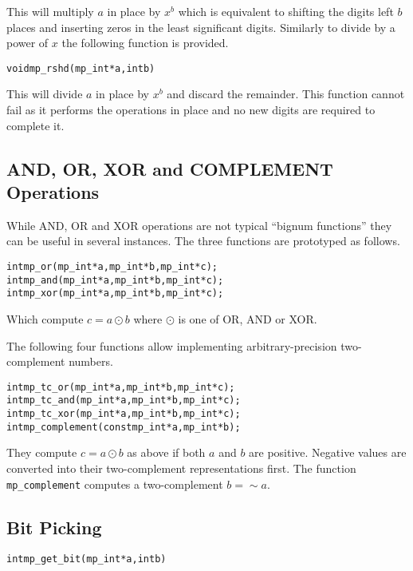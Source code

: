 \documentclass[synpaper]{book}
\begin{document}
This will multiply $a$ in place by $x^b$ which is equivalent to shifting the digits left $b$ places and inserting zeros
in the least significant digits.  Similarly to divide by a power of $x$ the following function is provided.

\begin{alltt}
void mp_rshd (mp_int * a, int b)
\end{alltt}
This will divide $a$ in place by $x^b$ and discard the remainder.  This function cannot fail as it performs the operations
in place and no new digits are required to complete it.

\subsection{AND, OR, XOR and COMPLEMENT Operations}

While AND, OR and XOR operations are not typical ``bignum functions'' they can be useful in several instances.  The
three functions are prototyped as follows.

  
\begin{alltt}
int mp_or  (mp_int * a, mp_int * b, mp_int * c);
int mp_and (mp_int * a, mp_int * b, mp_int * c);
int mp_xor (mp_int * a, mp_int * b, mp_int * c);
\end{alltt}

Which compute $c = a \odot b$ where $\odot$ is one of OR, AND or XOR.

The following four functions allow implementing arbitrary-precision two-complement numbers.

    \label{tcbitwiseops}
\begin{alltt}
int mp_tc_or  (mp_int * a, mp_int * b, mp_int * c);
int mp_tc_and (mp_int * a, mp_int * b, mp_int * c);
int mp_tc_xor (mp_int * a, mp_int * b, mp_int * c);
int mp_complement(const mp_int *a, mp_int *b);
\end{alltt}

They compute $c = a \odot b$ as above if both $a$ and $b$ are positive. Negative values are converted into their two-complement representations first. The function \texttt{mp\_complement} computes a two-complement $b = \sim a$.


\subsection{Bit Picking}
\begin{alltt}
int mp_get_bit(mp_int *a, int b)
\end{alltt}
\end{document}
